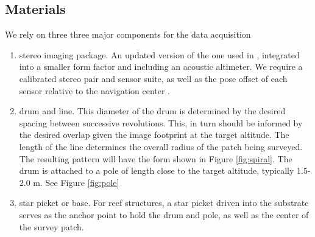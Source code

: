 
\subsection{Materials}
We rely on three three major components for the data acquisition
\begin{enumerate}
\item stereo imaging package. An updated version of the one used in \cite{Henderson_2013} \cite{Camilli_2007}, integrated into a smaller form factor and including an acoustic altimeter. We require a calibrated stereo pair and sensor suite, as well as the pose offset of each sensor relative to the navigation center \cite{Johnson_Roberson_2013} \cite{Mahon_2008}.
\item drum and line. This diameter of the drum is determined by the desired spacing between successive revolutions. This, in turn should be informed by the desired overlap given the image footprint at the target altitude. The length of the line determines the overall radius of the patch being surveyed. The resulting pattern will have the form shown in Figure \ref{fig:spiral}. The drum is attached to a pole of length close to the target altitude, typically 1.5-2.0 m. See Figure \ref{fig:pole}




\item star picket or base. For reef structures, a star picket driven into the substrate serves as the anchor point to hold the drum and pole, as well as the center of the survey patch.

\end{enumerate}


  